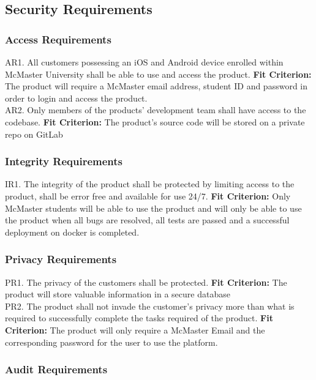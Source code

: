 \documentclass[12pt, titlepage]{article}
\begin{document}
\subsection{Security Requirements}

\subsubsection{Access Requirements}

AR1. All customers possessing an iOS and Android device enrolled within McMaster University shall be able to use and access the product.
	\textbf{Fit Criterion:} The product will require a McMaster email address, student ID and password in order to login and access the product. \\

\noindent AR2. Only members of the products’ development team shall have access to the codebase.
	\textbf{Fit Criterion:} The product’s source code will be stored on a private repo on GitLab

\subsubsection{Integrity Requirements}

IR1. The integrity of the product shall be protected by limiting access to the product, shall be error free and available for use 24/7.
	\textbf{Fit Criterion:} Only McMaster students will be able to use the product and will only be able to use the product when all bugs are resolved, all tests are passed and a successful deployment on docker is completed.

\subsubsection{Privacy Requirements}

PR1. The privacy of the customers shall be protected.
	\textbf{Fit Criterion:} The product will store valuable information in a secure database\\

\noindent PR2. The product shall not invade the customer’s privacy more than what is required to successfully complete the tasks required of the product. 
	\textbf{Fit Criterion:} The product will only require a McMaster Email and the corresponding password for the user to use the platform.

\subsubsection{Audit Requirements}
\end{document}
